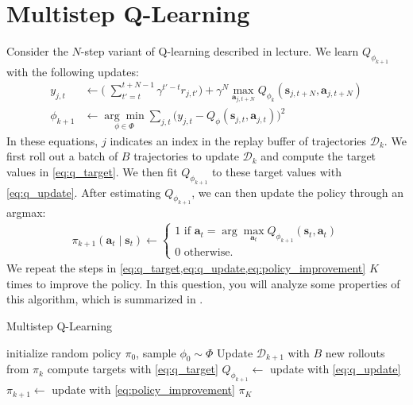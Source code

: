 \section{Multistep Q-Learning}

\ifsolutions

\fi

\def\solve#1{\csname solution to #1\endcsname}

\begingroup
\def\Q{Q_{\phi_k}}
\def\Qn{Q_{\phi_{k+1}}}
\def\D{\mathcal{D}}

Consider the $N$-step variant of Q-learning described in lecture. We learn $\Qn$ with the following updates:\begin{align}
  y_{j,t} &\gets \biggl(\;\sum_{t'=t}^{t+N-1} \gamma^{t'-t} r_{j,t'}\biggr)+\gamma^{N} \max _{\mathbf{a}_{j,t+N}} \Q\left(\mathbf{s}_{j,t+N}, \mathbf{a}_{j,t+N}\right) \label{eq:q_target}\\
  \phi_{k+1} &\gets \underset{\phi\in\Phi}{\arg\min}  \sum_{j,t} \bigl( y_{j,t}-Q_{\phi}(\mathbf s_{j,t},\mathbf a_{j,t}) \bigr)^2 \label{eq:q_update}
\end{align}
In these equations, $j$ indicates an index in the replay buffer of trajectories $\D_k$. We first roll out a batch of $B$ trajectories to update $\D_k$ and compute the target values in \eqref{eq:q_target}. We then fit $\Qn$ to these target values with \eqref{eq:q_update}. 
After estimating $\Qn$, we can then update the policy through an argmax:\begin{align}
  \pi_{k+1}\left(\mathbf{a}_{t} \mid \mathbf{s}_{t}\right)\gets \left\{\begin{array}{l}1 \text { if } \mathbf{a}_{t}=\arg \max _{\mathbf{a}_{t}} Q_{\phi_{k+1}}\left(\mathbf{s}_{t}, \mathbf{a}_{t}\right) \\ 0 \text{ otherwise. }\end{array}\right. \label{eq:policy_improvement}
\end{align}
We repeat the steps in \cref{eq:q_target,eq:q_update,eq:policy_improvement} $K$ times to improve the policy. In this question, you will analyze some properties of this algorithm, which is summarized in .

\begin{algorithm}
\caption{Multistep Q-Learning}
\label{alg:multi}
\begin{algorithmic}[1]
	\State initialize random policy $\pi_0$, sample $\phi_0\sim\Phi$
		\State Update $\D_{k+1}$ with $B$ new rollouts from $\pi_k$ \label{eq:data}
		\State compute targets with \eqref{eq:q_target}
		\State $Q_{\phi_{k+1}} \gets$ update with \eqref{eq:q_update}
		\State $\pi_{k+1} \gets$ update with \eqref{eq:policy_improvement}
	\EndFor
	\State\Return $\pi_{K}$
\end{algorithmic}	
\end{algorithm}



